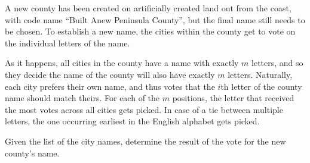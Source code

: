 






A new county has been created on artificially created land out from the coast,
with code name ``Built Anew Peninsula County'',
but the final name still needs to be chosen.
To establish a new name, the cities within the county get to vote on the individual letters of the name.

As it happens, all cities in the county have a name with exactly $m$ letters,
and so they decide the name of the county will also have exactly $m$ letters.
Naturally, each city prefers their own name, and thus votes that the $i$th letter of the county name should match theirs.
For each of the $m$ positions, the letter that received the most votes across all cities gets picked.
In case of a tie between multiple letters, the one occurring earliest in the English alphabet gets picked.

Given the list of the city names, determine the result of the vote for
the new county's name.


